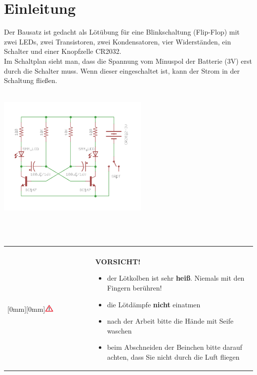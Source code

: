 \documentclass[a4paper]{article}
\newcommand\Vorsicht[1]{%
\ \\
\begin{tabular}{p{0.16\textwidth} p{0.79\textwidth}|}
\cline{2-2}
& \\
 \multirow{5}{*}{\raisebox{0mm}[0mm][0mm]{\includegraphics[width=0.1\textwidth]{../pictures/Vorsicht.png}}} & \textbf{VORSICHT!}{\begin{flushleft}#1\end{flushleft}} \\
\cline{2-2}
\end{tabular}
\ \\
}
\begin{document}
\section{Einleitung}
Der Bausatz ist gedacht als Lötübung für eine Blinkschaltung (Flip-Flop) mit zwei LEDs, zwei Transistoren, zwei Kondensatoren, vier Widerständen, ein Schalter und einer Knopfzelle CR2032.\\
Im Schaltplan sieht man, dass die Spannung vom Minuspol der Batterie (3V) erst durch die Schalter muss. Wenn dieser eingeschaltet ist, kann der Strom in der Schaltung fließen.\\
\ \\
\begin{minipage}[t]{\textwidth}
  \centering
  \includegraphics[width=0.55\textwidth]{../pictures/schematic.png}
  \label{img:Schematic}
\end{minipage}
\ \\
\Vorsicht{\begin{itemize} \item der Lötkolben ist sehr \textbf{heiß}. Niemals mit den Fingern berühren!
\item die Lötdämpfe \textbf{nicht} einatmen \item nach der Arbeit bitte die Hände mit Seife waschen\item beim Abschneiden der Beinchen bitte darauf achten, dass Sie nicht durch die Luft fliegen\end{itemize}}\\
\ \\
\newpage
\end{document}
